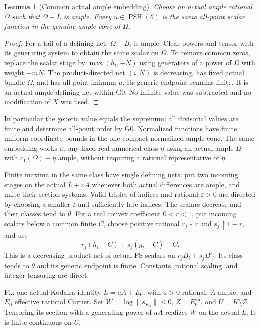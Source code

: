 \documentclass[10pt]{article}
\newtheorem{lemma}[theorem]{Lemma}
\newcommand{\PSH}{\operatorname{PSH}}
\newcommand{\an}{\mathrm{an}}
\begin{document}
\begin{lemma}[Common actual ample embedding]\label{embed}
Choose an actual ample rational $\Omega$ such that $\Omega-L$ is
ample. Every $u\in\PSH(\theta)$ is the same all-point scalar function
in the genuine ample cone of $\Omega$.
\end{lemma}
\begin{proof}
For a tail of a defining net, $\Omega-B_i$ is ample. Clear powers
and tensor with its generating system to obtain the same scalar on
$\Omega$. To remove common zeros, replace the scalar stage by
$\max(h_i,-N)$ using generators of a power of $\Omega$ with weight
$-mN$. The product-directed net $(i,N)$ is decreasing, has fixed
actual bundle $\Omega$, and has all-point infimum $u$. Its generic
endpoint remains finite. It is an actual ample defining net within G0.
No infinite value was subtracted and no modification of $X$ was used.
\end{proof}

In particular the generic value equals the supremum; all divisorial
values are finite and determine all-point order by G0. Normalized
functions have finite uniform coordinate bounds in the one compact
normalized ample cone. The same embedding works at any fixed real
numerical class $\eta$ using an actual ample $\Omega$ with
$c_1(\Omega)-\eta$ ample, without requiring a rational representative
of $\eta$.

Finite maxima in the same class have single defining nets: put two
incoming stages on the actual $L+\varepsilon A$ whenever both actual
differences are ample, and unite their section systems. Valid triples
of indices and rational $\varepsilon>0$ are directed by choosing a
smaller $\varepsilon$ and sufficiently late indices. The scalars
decrease and their classes tend to $\theta$.
For a real convex coefficient $0<r<1$, put incoming scalars below a
common finite $C$, choose positive rational $r_j\uparrow r$ and
$s_j\uparrow1-r$, and use
\[
 r_j(h_i-C)+s_j(g_l-C)+C.
\]
This is a decreasing product net of actual FS scalars on
$r_jB_i+s_jB'_l$. Its class tends to $\theta$ and its generic endpoint
is finite. Constants, rational scaling, and integer tensoring are direct.

Fix one actual Kodaira identity $L=aA+E_0$, with $a>0$ rational,
$A$ ample, and $E_0$ effective rational Cartier. Set
$W=\log\|s_{E_0}\|\leq0$, $Z=E_0^\an$, and $U=K\setminus Z$.
Tensoring its section with a generating power of $aA$ realizes $W$
on the actual $L$. It is finite continuous on $U$.
\end{document}
